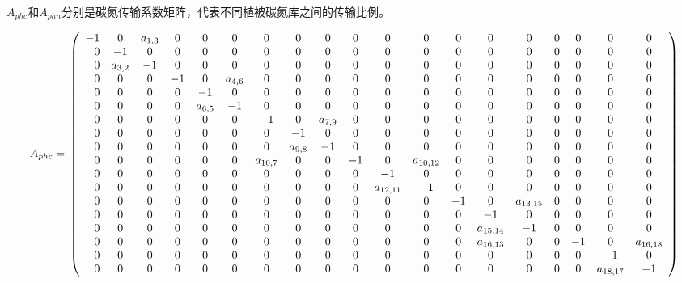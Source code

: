 $A_{phc}$和$A_{phn}$分别是碳氮传输系数矩阵，代表不同植被碳氮库之间的传输比例。
\begin{landscape}
\begin{equation}
  A_{phc}=\\
  \left(\begin{array}{rcccccccccccccccccc}
      -1 & 0 & a_{1,3} & 0 & 0 & 0 & 0 & 0 & 0 & 0 & 0 & 0 & 0 & 0 & 0 & 0 & 0 & 0 & 0 \\
       0 & -1 & 0 & 0 & 0 & 0 & 0 & 0 & 0 & 0 & 0 & 0 & 0 & 0 & 0 & 0 & 0 & 0 & 0 \\ 
       0 & a_{3,2} & -1 & 0 & 0 & 0 & 0 & 0 & 0 & 0 & 0 & 0 & 0 & 0 & 0 & 0 & 0 & 0 & 0 \\
       0 & 0 & 0 & -1 & 0 & a_{4,6} & 0 & 0 & 0 & 0 & 0 & 0 & 0 & 0 & 0 & 0 & 0 & 0 & 0 \\ 
       0 & 0 & 0 & 0 & -1 & 0 & 0 & 0 & 0 & 0 & 0 & 0 & 0 & 0 & 0 & 0 & 0 & 0 & 0 \\ 
       0 & 0 & 0 & 0 & a_{6,5} & -1 & 0 & 0 & 0 & 0 & 0 & 0 & 0 & 0 & 0 & 0 & 0 & 0 & 0 \\
       0 & 0 & 0 & 0 & 0 & 0 & -1 & 0 & a_{7,9} & 0 & 0 & 0 & 0 & 0 & 0 & 0 & 0 & 0 & 0 \\ 
       0 & 0 & 0 & 0 & 0 & 0 & 0 & -1 & 0 & 0 & 0 & 0 & 0 & 0 & 0 & 0 & 0 & 0 & 0 \\
       0 & 0 & 0 & 0 & 0 & 0 & 0 & a_{9,8} & -1 & 0 & 0 & 0 & 0 & 0 & 0 & 0 & 0 & 0 & 0 \\
       0 & 0 & 0 & 0 & 0 & 0 & a_{10,7} & 0 & 0 & -1 & 0 & a_{10,12} & 0 & 0 & 0 & 0 & 0 & 0 & 0 \\
       0 & 0 & 0 & 0 & 0 & 0 & 0 & 0 & 0 & 0 & -1 & 0 & 0 & 0 & 0 & 0 & 0 & 0 &0 \\
       0 & 0 & 0 & 0 & 0 & 0 & 0 & 0 & 0 & 0 & a_{12,11}&-1 & 0 & 0 & 0 & 0 & 0 & 0 & 0\\
       0 & 0 & 0 & 0 & 0 & 0 & 0 & 0 & 0 & 0 & 0 & 0 & -1 & 0 & a_{13,15} & 0 & 0 & 0 & 0\\
       0 & 0 & 0 & 0 & 0 & 0 & 0 & 0 & 0 & 0 & 0 & 0 & 0 & -1 & 0 & 0 & 0 & 0 & 0 \\
       0 & 0 & 0 & 0 & 0 & 0 & 0 & 0 & 0 & 0 & 0 & 0 & 0 & a_{15,14}&-1 & 0 & 0 & 0 & 0\\
       0 & 0 & 0 & 0 & 0 & 0 & 0 & 0 & 0 & 0 & 0 & 0 & 0 & a_{16,13} & 0 & 0 & -1 & 0 & a_{16,18} \\
       0 & 0 & 0 & 0 & 0 & 0 & 0 & 0 & 0 & 0 & 0 & 0 & 0 & 0 & 0 & 0 & 0&-1 & 0\\
       0 & 0 & 0 & 0 & 0 & 0 & 0 & 0 & 0 & 0 & 0 & 0 & 0 & 0 & 0 & 0 & 0 &  a_{18,17} & -1\end{array}\right)
  \end{equation}
\end{landscape}
